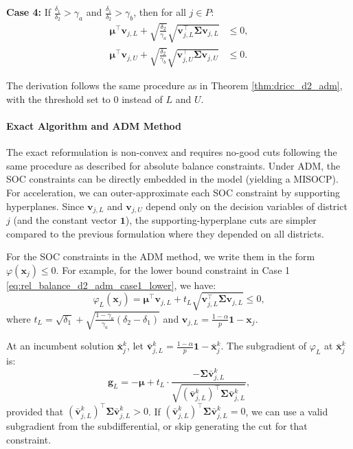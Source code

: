\documentclass[preprint,12pt,authoryear]{elsarticle}
\begin{document}
\textbf{Case 4:} If $\frac{\delta_1}{\delta_2} > \gamma_a$ and $\frac{\delta_1}{\delta_2} > \gamma_b$, then for all $j \in P$:
\begin{align}
\boldsymbol{\mu}^\top \mathbf{v}_{j,L} + \sqrt{\frac{\delta_2}{\gamma_a}} \sqrt{\mathbf{v}_{j,L}^\top \boldsymbol{\Sigma} \mathbf{v}_{j,L}} &\leqslant 0, \label{eq:rel_balance_d2_adm_case4_lower} \\
\boldsymbol{\mu}^\top \mathbf{v}_{j,U} + \sqrt{\frac{\delta_2}{\gamma_b}} \sqrt{\mathbf{v}_{j,U}^\top \boldsymbol{\Sigma} \mathbf{v}_{j,U}} &\leqslant 0. \label{eq:rel_balance_d2_adm_case4_upper}
\end{align}

The derivation follows the same procedure as in Theorem \ref{thm:dricc_d2_adm}, with the threshold set to 0 instead of $L$ and $U$.

\paragraph{Exact Algorithm and ADM Method}
The exact reformulation is non-convex and requires no-good cuts following the same procedure as described for absolute balance constraints. Under ADM, the SOC constraints can be directly embedded in the model (yielding a MISOCP). For acceleration, we can outer-approximate each SOC constraint by supporting hyperplanes. Since $\mathbf{v}_{j,L}$ and $\mathbf{v}_{j,U}$ depend only on the decision variables of district $j$ (and the constant vector $\mathbf{1}$), the supporting-hyperplane cuts are simpler compared to the previous formulation where they depended on all districts.

For the SOC constraints in the ADM method, we write them in the form $\varphi(\mathbf{x}_j) \leqslant 0$. For example, for the lower bound constraint in Case 1 \eqref{eq:rel_balance_d2_adm_case1_lower}, we have:
\begin{equation}
\varphi_L(\mathbf{x}_j) = \boldsymbol{\mu}^\top \mathbf{v}_{j,L} + t_L \sqrt{\mathbf{v}_{j,L}^\top \boldsymbol{\Sigma} \mathbf{v}_{j,L}} \leqslant 0,
\end{equation}
where $t_L = \sqrt{\delta_1} + \sqrt{\frac{1 - \gamma_a}{\gamma_a} (\delta_2 - \delta_1)}$ and $\mathbf{v}_{j,L} = \frac{1-\alpha}{p} \mathbf{1} - \mathbf{x}_j$.

At an incumbent solution $\bar{\mathbf{x}}_j^k$, let $\bar{\mathbf{v}}_{j,L}^k = \frac{1-\alpha}{p} \mathbf{1} - \bar{\mathbf{x}}_j^k$. The subgradient of $\varphi_L$ at $\bar{\mathbf{x}}_j^k$ is:
\begin{equation}
\mathbf{g}_L = -\boldsymbol{\mu} + t_L \cdot \frac{-\boldsymbol{\Sigma} \bar{\mathbf{v}}_{j,L}^k}{\sqrt{(\bar{\mathbf{v}}_{j,L}^k)^{\top} \boldsymbol{\Sigma} \bar{\mathbf{v}}_{j,L}^k}},
\end{equation}
provided that $(\bar{\mathbf{v}}_{j,L}^k)^{\top} \boldsymbol{\Sigma} \bar{\mathbf{v}}_{j,L}^k > 0$. If $(\bar{\mathbf{v}}_{j,L}^k)^{\top} \boldsymbol{\Sigma} \bar{\mathbf{v}}_{j,L}^k = 0$, we can use a valid subgradient from the subdifferential, or skip generating the cut for that constraint.
\end{document}
